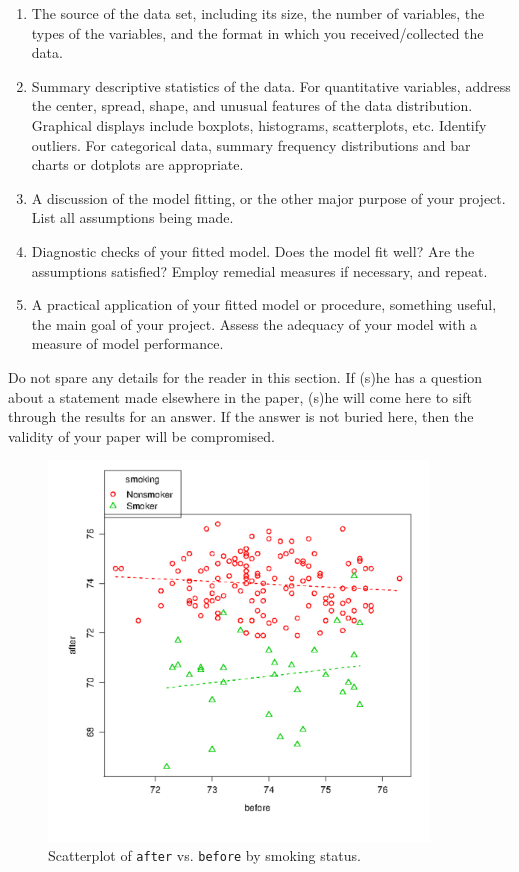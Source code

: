 \documentclass[11pt]{article}
\begin{document}
\begin{enumerate}
\item The source of the data set, including its size, the number of
variables, the types of the variables, and the format in which you
received/collected the data.
\item Summary descriptive statistics of the data. For quantitative
variables, address the center, spread, shape, and unusual features
of the data distribution. Graphical displays include boxplots,
histograms, scatterplots, etc. Identify outliers. For categorical
data, summary frequency distributions and bar charts or dotplots
are appropriate.
\item A discussion of the model fitting, or the other major purpose of
your project. List all assumptions being made.
\item Diagnostic checks of your fitted model. Does the model fit well?
Are the assumptions satisfied? Employ remedial measures if
necessary, and repeat.
\item A practical application of your fitted model or procedure,
something useful, the main goal of your project. Assess the
adequacy of your model with a measure of model performance.
\end{enumerate}

Do not spare any details for the reader in this section. If (s)he has
a question about a statement made elsewhere in the paper, (s)he will
come here to sift through the results for an answer.  If the answer is
not buried here, then the validity of your paper will be compromised.

\begin{figure}[ht]
\centering
\includegraphics[width=0.90\textwidth]{examplefig.pdf}
\caption[A scatterplot]{\label{fig-scatterplot}\small Scatterplot of \texttt{after} vs. \texttt{before} by smoking status.}
\end{figure}
\end{document}

